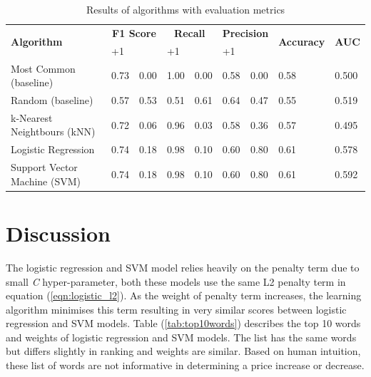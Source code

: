 \documentclass[transmag]{IEEEtran}
\begin{document}
\begin{table}[!h]

\begin{tabularx}{\textwidth}{|| p{5cm} | X | X | X | X | X | X | X | X ||}
\hline
\multirow{2}{*}{\textbf{Algorithm}}  & \multicolumn{2}{c|}{\textbf{F1 Score}} & \multicolumn{2}{c|}{\textbf{Recall}} & \multicolumn{2}{c|}{\textbf{Precision}} & \multirow{2}{*}{\textbf{Accuracy}} & \multirow{2}{*}{\textbf{AUC}} \\ 
\cline{2-7}
& \centering +1& \centering -1 & \centering +1 & \centering -1 & \centering +1 & \centering -1 & & \\ 
\hline
Most Common (baseline) & 0.73 & 0.00 & 1.00 & 0.00 & 0.58 & 0.00 & 0.58 & 0.500 \\
\hline
Random (baseline) & 0.57 & 0.53 & 0.51 & 0.61 & 0.64 & 0.47 & 0.55 & 0.519 \\
\hline
k-Nearest Neightbours (kNN) & 0.72 & 0.06 & 0.96 & 0.03 & 0.58 & 0.36 & 0.57 & 0.495 \\
\hline
Logistic Regression & 0.74 & 0.18& 0.98 & 0.10 & 0.60 & 0.80 & 0.61 & 0.578 \\
\hline
Support Vector Machine (SVM) & 0.74 & 0.18 & 0.98 & 0.10 & 0.60 & 0.80 & 0.61 & 0.592 \\
\hline

\hline
\end{tabularx}
\caption{Results of algorithms with evaluation metrics}
    \label{tab:results}%
\end{table}


\section{Discussion}
\noindent The logistic regression and SVM model relies heavily on the penalty term due to small \emph{C} hyper-parameter, both these models use the same L2 penalty term in equation (\ref{eqn:logistic_l2}). As the weight of penalty term increases, the learning algorithm minimises this term resulting in very similar scores between logistic regression and SVM models. Table (\ref{tab:top10words}) describes the top 10 words and weights of logistic regression and SVM models. The list has the same words but differs slightly in ranking and weights are similar. Based on human intuition, these list of words are not informative in determining a price increase or decrease.
\end{document}
